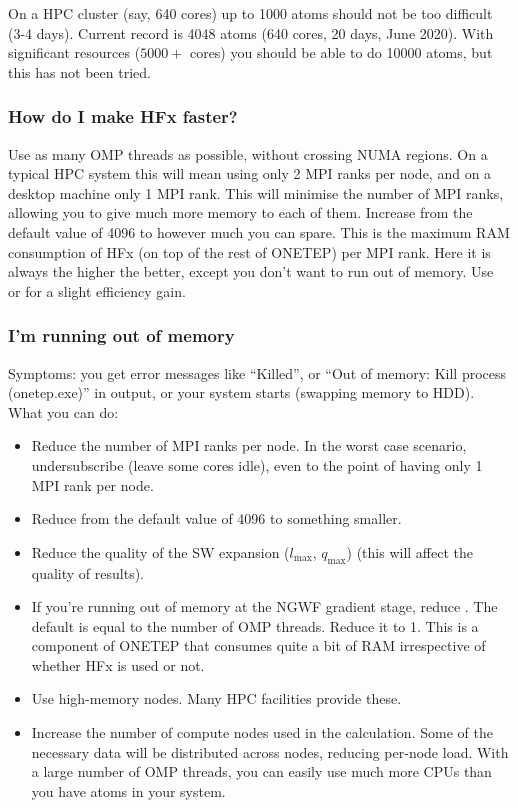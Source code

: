 \documentclass[letterpaper,10pt,english]{sphinxmanual}
\begin{document}
On a HPC cluster (say, 640 cores) up to 1000 atoms should not be too
difficult (3-4 days). Current record is 4048 atoms (640 cores, 20 days,
June 2020). With significant resources (\(5000+\) cores) you should
be able to do 10000 atoms, but this has not been tried.


\subsubsection{How do I make HFx faster?}
\label{\detokenize{hfx:how-do-i-make-hfx-faster}}
Use as many OMP threads as possible, without crossing NUMA regions. On a
typical HPC system this will mean using only 2 MPI ranks per node, and
on a desktop machine \textendash{} only 1 MPI rank. This will minimise the number of
MPI ranks, allowing you to give much more memory to each of them.
Increase  from the default value of 4096 to however
much you can spare. This is the maximum RAM consumption of HFx (on top
of the rest of ONETEP) per MPI rank. Here it is always the higher the
better, except you don’t want to run out of memory. Use  or for a slight
efficiency gain.


\subsubsection{I’m running out of memory}
\label{\detokenize{hfx:im-running-out-of-memory}}
Symptoms: you get error messages like “Killed”, or “Out of memory: Kill
process  (onetep.exe)” in  output, or your system starts
 (swapping memory to HDD). What you can do:
\begin{itemize}
\item {} 
Reduce the number of MPI ranks per node. In the worst case scenario,
undersubscribe (leave some cores idle), even to the point of having
only 1 MPI rank per node.

\item {} 
Reduce  from the default value of 4096 to
something smaller.

\item {} 
Reduce the quality of the SW expansion (\(l_{\textrm{max}}\),
\(q_{\textrm{max}}\)) (this will affect the quality of results).

\item {} 
If you’re running out of memory at the NGWF gradient stage, reduce
. The default is equal to the number of OMP
threads. Reduce it to 1. This is a component of ONETEP that consumes
quite a bit of RAM irrespective of whether HFx is used or not.

\item {} 
Use high-memory nodes. Many HPC facilities provide these.

\item {} 
Increase the number of compute nodes used in the calculation. Some of
the necessary data will be distributed across nodes, reducing
per-node load. With a large number of OMP threads, you can easily use
much more CPUs than you have atoms in your system.

\end{itemize}
\end{document}
